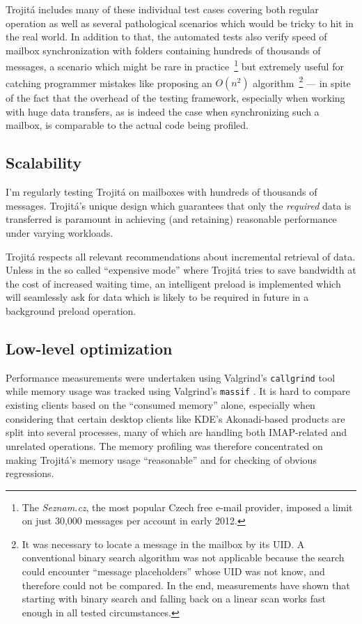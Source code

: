 \documentclass[trojita]{subfiles}
\begin{document}
Trojitá includes many of these individual test cases covering both regular operation as well as several pathological
scenarios which would be tricky to hit in the real world.  In addition to that, the automated tests also verify speed of
mailbox synchronization with folders containing hundreds of thousands of messages, a scenario which might be rare in
practice~\footnote{The {\em Seznam.cz}, the most popular Czech free e-mail provider, imposed a limit on just 30,000
messages per account in early 2012.} but extremely useful for catching programmer mistakes like proposing an $O(n^2)$
algorithm~\footnote{It was necessary to locate a message in the mailbox by its UID.  A conventional binary search
algorithm was not applicable because the search could encounter ``message placeholders'' whose UID was not know, and
therefore could not be compared.  In the end, measurements have shown that starting with binary search and falling back
on a linear scan works fast enough in all tested circumstances.} --- in spite of the fact that the overhead of the
testing framework, especially when working with huge data transfers, as is indeed the case when synchronizing such a
mailbox, is comparable to the actual code being profiled.

\subsection{Scalability}

I'm regularly testing Trojitá on mailboxes with hundreds of thousands of messages.  Trojitá's unique design which
guarantees that only the {\em required} data is transferred is paramount in achieving (and retaining) reasonable
performance under varying workloads.

Trojitá respects all relevant recommendations about incremental retrieval of data.  Unless in the so called ``expensive
mode'' where Trojitá tries to save bandwidth at the cost of increased waiting time, an intelligent preload is
implemented which will seamlessly ask for data which is likely to be required in future in a background preload
operation.

\subsection{Low-level optimization}

Performance measurements were undertaken using Valgrind's \cite{valgrind} {\tt callgrind} \cite{valgrind-callgrind} tool
while memory usage was tracked using Valgrind's {\tt massif} \cite{valgrind-massif}.  It is hard to compare existing
clients based on the ``consumed memory'' alone, especially when considering that certain desktop clients like KDE's
Akonadi-based \cite{akonadi} products are split into several processes, many of which are handling both IMAP-related and
unrelated operations.  The memory profiling was therefore concentrated on making Trojitá's memory usage ``reasonable''
and for checking of obvious regressions.
\end{document}
